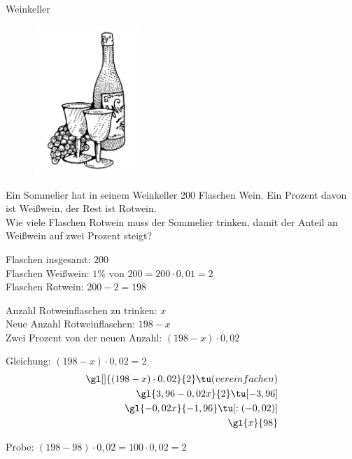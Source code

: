 \documentclass[12pt,a5paper,landscape]{scrartcl}
\begin{document}
\leereKarte

\begin{karte3}{Weinkeller}
	\begin{figure}
	\includegraphics[width=4cm]{7.4-LT-Abb_Wein}
	\end{figure}

	Ein Sommelier hat in seinem Weinkeller 200 Flaschen Wein. Ein Prozent davon ist Weißwein, der Rest ist Rotwein.\\[1em]
	
	Wie viele Flaschen Rotwein muss der Sommelier trinken, damit der Anteil an Weißwein auf zwei Prozent steigt?
	
\end{karte3}

\begin{loesungskarte}
	\begin{multicols}{2}\small
		Flaschen insgesamt: $200$ \\
		Flaschen Weißwein: $1\%\text{ von }200 = 200\cdot 0,01 = 2$ \\
		Flaschen Rotwein: $200-2 = 198$
		
		Anzahl Rotweinflaschen zu trinken: $x$ \\
		Neue Anzahl Rotweinflaschen: $198-x$ \\
		Zwei Prozent von der neuen Anzahl: $(198-x)\cdot 0,02$
	\end{multicols}

	Gleichung: $(198-x)\cdot 0,02 = 2$
	\begin{alignat*}{3}
		\gl[]{(198-x)\cdot 0,02}{2} \tu(vereinfachen) \\
		\gl{3,96 - 0,02x}{2} \tu[-3,96] \\
		\gl{-0,02x}{-1,96} \tu[:(-0,02)] \\
		\gl{x}{98}
	\end{alignat*}
	
	Probe: $(198-98)\cdot 0,02 = 100\cdot 0,02 = 2$
\end{loesungskarte}
\end{document}

